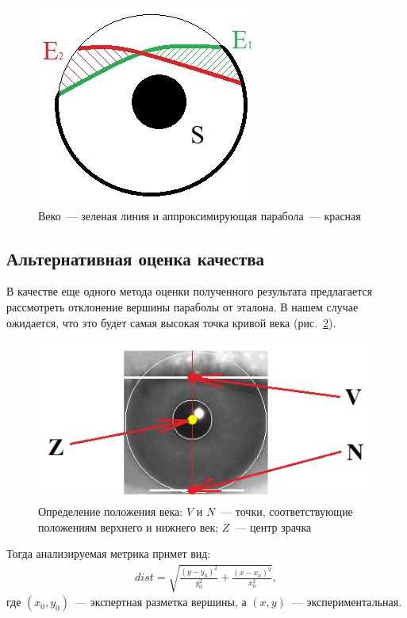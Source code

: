 \documentclass[12pt,a4paper]{article} %
\begin{document}
\begin{figure}[h]
	
	\centering
	
	\includegraphics[width=0.33\linewidth]{glaz8.jpg}
	
	\caption{Веко~--- зеленая линия и аппроксимирующая парабола~--- красная}
	
	\label{fig:glaz8}
	
\end{figure}
\newpage
\subsection{Альтернативная оценка качества}

В качестве еще одного метода оценки полученного результата предлагается рассмотреть отклонение вершины параболы от эталона. В нашем случае ожидается, что это будет самая высокая точка кривой века (рис.~\ref{fig:glaz2}).

\begin{figure}[h]
	
	\centering
	
	\includegraphics[width=0.6\linewidth]{glaz2.jpg}
	
	\caption{Определение положения века: $V$ и $N$~--- точки, соответствующие положениям верхнего и нижнего век; $Z$~--- центр зрачка}
	
	\label{fig:glaz2}
	
\end{figure}

Тогда анализируемая метрика примет вид:
\begin{gather}\label{dist}
dist = \sqrt{\frac{(y-y_0)^2}{y_0^2}+\frac{(x-x_0)^2}{x_0^2}},
\end{gather}
где $(x_0, y_0)$~--- экспертная разметка вершины, а $(x,y)$~--- экспериментальная.
\end{document}
